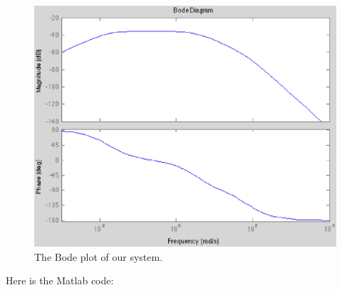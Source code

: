 \documentclass{notes}
\begin{document}
\begin{figure}[!h]
  \begin{center}
    \includegraphics[width=5 in]{pics/performance_measurements/bode_plot.eps}
  \end{center}
  \caption{The Bode plot of our system.}
  \label{fig:bode_plot}
\end{figure}

Here is the Matlab code:
%  
\end{document}
